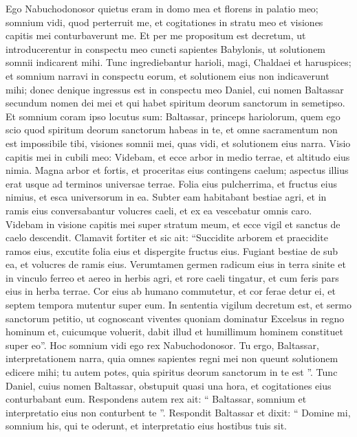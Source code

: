 \begin{biblechapter}
\begin{biblechapter}
\begin{biblechapter}
\begin{biblechapter}
\verse Ego Nabuchodonosor quietus eram in domo mea et florens in palatio meo; 
 \verse somnium vidi, quod perterruit me, et cogitationes in stratu meo et visiones capitis mei conturbaverunt me. 
\verse Et per me propositum est decretum, ut introducerentur in conspectu meo cuncti sapientes Babylonis, ut solutionem somnii indicarent mihi. 
\verse Tunc ingrediebantur harioli, magi, Chaldaei et haruspices; et somnium narravi in conspectu eorum, et solutionem eius non indicaverunt mihi; 
\verse donec denique ingressus est in conspectu meo Daniel, cui nomen Baltassar secundum nomen dei mei et qui habet spiritum deorum sanctorum in semetipso. Et somnium coram ipso locutus sum: 
\verse Baltassar, princeps hariolorum, quem ego scio quod spiritum deorum sanctorum habeas in te, et omne sacramentum non est impossibile tibi, visiones somnii mei, quas vidi, et solutionem eius narra. 
\verse Visio capitis mei in cubili meo:
 Videbam, et ecce arbor in medio terrae,
 et altitudo eius nimia.
 \verse Magna arbor et fortis,
 et proceritas eius contingens caelum;
 aspectus illius erat usque ad terminos universae terrae.
 \verse Folia eius pulcherrima,
 et fructus eius nimius,
 et esca universorum in ea.
 Subter eam habitabant bestiae agri,
 et in ramis eius conversabantur volucres caeli,
 et ex ea vescebatur omnis caro.
 \verse Videbam in visione capitis mei super stratum meum,
 et ecce vigil et sanctus de caelo descendit.
 \verse Clamavit fortiter et sic ait:
 “Succidite arborem et praecidite ramos eius,
 excutite folia eius et dispergite fructus eius.
 Fugiant bestiae de sub ea,
 et volucres de ramis eius.
 \verse Verumtamen germen radicum eius in terra sinite
 et in vinculo ferreo et aereo in herbis agri,
 et rore caeli tingatur,
 et cum feris pars eius in herba terrae.
 \verse Cor eius ab humano commutetur,
 et cor ferae detur ei,
 et septem tempora mutentur super eum.
 \verse In sententia vigilum decretum est,
 et sermo sanctorum petitio,
 ut cognoscant viventes
 quoniam dominatur Excelsus in regno hominum
 et, cuicumque voluerit, dabit illud
 et humillimum hominem constituet super eo”.
 \verse Hoc somnium vidi ego rex Nabuchodonosor. Tu ergo, Baltassar, interpretationem narra, quia omnes sapientes regni mei non queunt solutionem edicere mihi; tu autem potes, quia spiritus deorum sanctorum in te est ”.
 \verse Tunc Daniel, cuius nomen Baltassar, obstupuit quasi una hora, et cogitationes eius conturbabant eum. Respondens autem rex ait: “ Baltassar, somnium et interpretatio eius non conturbent te ”. Respondit Baltassar et dixit: “ Domine mi, somnium his, qui te oderunt, et interpretatio eius hostibus tuis sit. 

\end{biblechapter}
\end{biblechapter}
\end{biblechapter}
\end{biblechapter}
